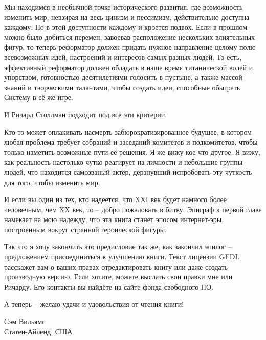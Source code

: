 Мы находимся в необычной точке исторического развития, где
возможность изменить мир, невзирая на весь цинизм и пессимизм,
действительно доступна каждому. Но в этой доступности каждому
и кроется подвох. Если в прошлом можно было добиться перемен,
завоевав расположение нескольких влиятельных фигур, то теперь
реформатор должен придать нужное направление целому полю
всевозможных идей, настроений и интересов самых разных людей.
То есть, эффективный реформатор должен обладать в наше время
титанической волей и упорством, готовностью десятилетиями
голосить в пустыне, а также массой знаний и творческими талантами,
чтобы создать идеи, способные обыграть Систему в её же игре.

И Ричард Столлман подходит под все эти критерии.

Кто-то может оплакивать насмерть забюрократизированное будущее,
в котором любая проблема требует собраний и заседаний комитетов
и подкомитетов, чтобы только наметить возможные пути её решения.
Я же вижу кое-что другое. Я вижу, как реальность настолько чутко
реагирует на личности и небольшие группы людей, что находится
самозваный актёр, дерзнувший испробовать эту чуткость для того,
чтобы изменить мир.

И если вы один из тех, кто надеется, что XXI век будет намного более
человечным, чем XX век, то -- добро пожаловать в битву. Эпиграф к
первой главе намекает на мою надежду, что эта книга станет эпосом
интернет-эры, построенным вокруг странной героической фигуры.

Так что я хочу закончить это предисловие так же, как закончил
эпилог -- предложением присоединиться к улучшению книги. Текст
лицензии GFDL расскажет вам о ваших правах отредактировать книгу
или даже создать производную версию. Если хотите, можете выслать
свои правки мне или Ричарду. Его контакты вы найдёте на сайте
фонда свободного ПО.

А теперь -- желаю удачи и удовольствия от чтения книги!

\vspace{0.5in}
\noindent Сэм Вильямс\\
\noindent Статен-Айленд, США
